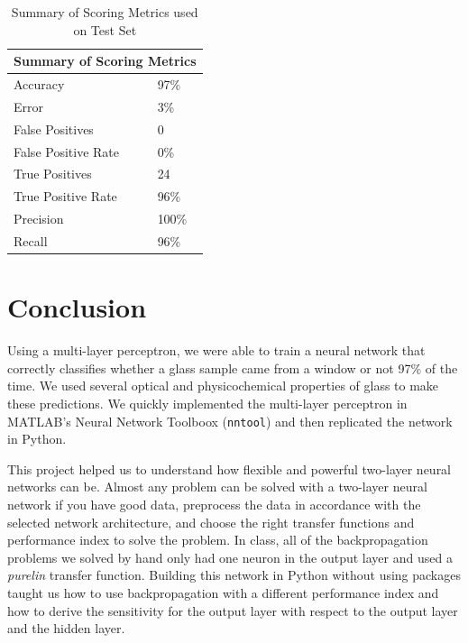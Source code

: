 \documentclass[12pt,halfline,a4paper]{ouparticle}
\begin{document}
\begin{table}[H]
\centering
\begin{tabular}{|l|l|}
\hline
\multicolumn{2}{|l|}{Summary of Scoring Metrics} \\ \hline
Accuracy                       & 97\%            \\ \hline
Error                          & 3\%             \\ \hline
False Positives                & 0               \\ \hline
False Positive Rate            & 0\%             \\ \hline
True Positives                 & 24              \\ \hline
True Positive Rate             & 96\%            \\ \hline
Precision                      & 100\%           \\ \hline
Recall                         & 96\%            \\ \hline
\end{tabular}
\caption{Summary of Scoring Metrics used on Test Set}
\label{my-label}
\end{table}

\section{Conclusion}
\label{sec7}

Using a multi-layer perceptron, we were able to train a neural network that correctly classifies whether a glass sample came from a window or not 97\% of the time. We used several optical and physicochemical properties of glass to make these predictions. We quickly implemented the multi-layer perceptron in MATLAB's Neural Network Toolboox (\verb|nntool|) and then replicated the network in Python. 

This project helped us to understand how flexible and powerful two-layer neural networks can be. Almost any problem can be solved with a two-layer neural network if you have good data, preprocess the data in accordance with the selected network architecture, and choose the right transfer functions and performance index to solve the problem. In class, all of the backpropagation problems we solved by hand only had one neuron in the output layer and used a \emph{purelin} transfer function. Building this network in Python without using packages taught us how to use backpropagation with a different performance index and how to derive the sensitivity for the output layer with respect to the output layer and the hidden layer. 
\end{document}
